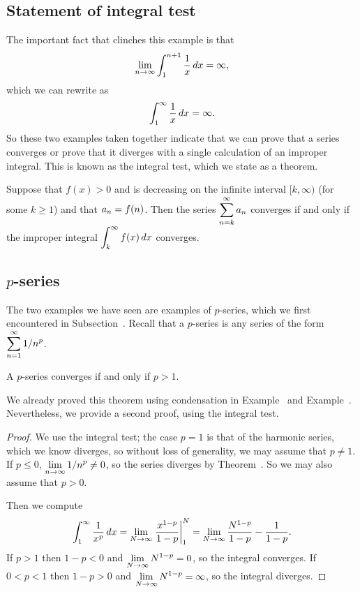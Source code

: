 \subsection{Statement of integral test}

The important fact that clinches this example is that
$$\lim_{n\to\infty} \int_1^{n+1} {1\over x}\,dx = \infty,$$
which we can rewrite as
$$\int_1^\infty {1\over x}\,dx = \infty.$$
So these two examples taken together indicate that we can prove that a
series converges or prove that it diverges with a single calculation
of an improper integral. This is known as the {\dfont integral
  test\/}, 
which we state as a theorem.

\begin{theorem}\label{thm:integral-test}
 Suppose that $f(x)>0$ and is decreasing on the infinite interval
$[k,\infty)$ (for some $k\ge1$)
and that $\displaystyle a_n=f(n)$. Then the series
$\displaystyle\sum_{n=k}^\infty a_n$ converges if and only if the improper
integral $\displaystyle\int_{k}^\infty f(x)\,dx$ converges.
\end{theorem}

\subsection{$p$-series}
\label{subsection:p-series-via-integration}

The two examples we have seen are examples of
$p$-series, which we first encountered in Subsection~.
Recall that a $p$-series is
any series of the form $\displaystyle \sum_{n=1}^\infty 1/n^p$.

\begin{theorem}\label{thm:p-series} A $p$-series converges if and only if $p>1$.
\end{theorem}

We already proved this theorem using condensation in Example~ and Example~.  Nevertheless, we provide a second proof, using the integral test.

\begin{proof}
We use the integral test; the case $p=1$ is that of the harmonic series, which we know diverges, so without loss of generality, we may assume that
$p \neq 1$.   If $p\le0$, $\displaystyle\lim_{n\to\infty} 1/n^p\not=0$, so the series diverges by Theorem~. So we may also assume that $p > 0$.

Then we compute
$$
  \int_1^{\infty} {1\over x^p}\,dx=\lim_{N\to\infty} \left.{x^{1-p}\over
  1-p}\right|_{1}^N=\lim_{N\to\infty} {N^{1-p}\over 1-p}-{1\over 1-p}.
$$
If $p>1$ then $1-p<0$ and $\displaystyle\lim_{N\to\infty}N^{1-p}=0$, so the
  integral converges. If $0<p<1$ then $1-p>0$ and 
$\displaystyle\lim_{N\to\infty}N^{1-p}=\infty$, so the integral diverges.
\end{proof}

